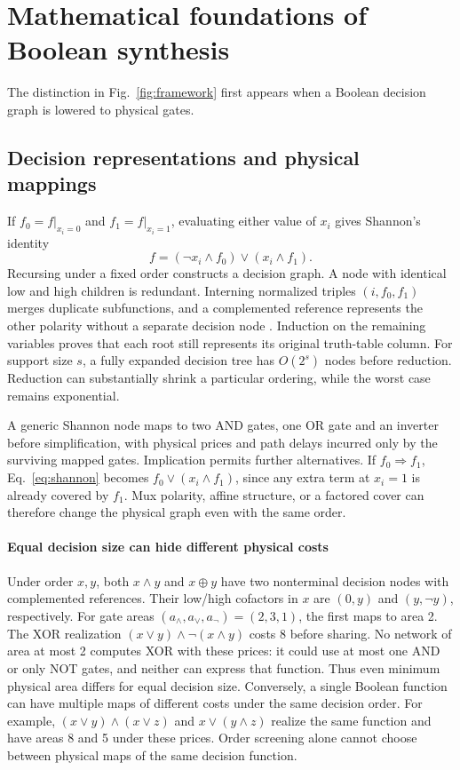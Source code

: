 \documentclass[journal,10pt]{IEEEtran}
\begin{document}
\section{Mathematical foundations of Boolean synthesis}
The distinction in Fig.~\ref{fig:framework} first appears when a Boolean decision graph is lowered to physical gates.
\subsection{Decision representations and physical mappings}
If \(f_0=f|_{x_i=0}\) and \(f_1=f|_{x_i=1}\), evaluating either value of \(x_i\) gives Shannon's identity \cite{shannon1949}
\begin{equation}
 f=(\neg x_i\land f_0)\lor(x_i\land f_1).
 \label{eq:shannon}
\end{equation}
Recursing under a fixed order constructs a decision graph. A node with identical low and high children is redundant. Interning normalized triples \((i,f_0,f_1)\) merges duplicate subfunctions, and a complemented reference represents the other polarity without a separate decision node \cite{bryant1986}. Induction on the remaining variables proves that each root still represents its original truth-table column. For support size \(s\), a fully expanded decision tree has \(O(2^s)\) nodes before reduction. Reduction can substantially shrink a particular ordering, while the worst case remains exponential.

A generic Shannon node maps to two AND gates, one OR gate and an inverter before simplification, with physical prices and path delays incurred only by the surviving mapped gates. Implication permits further alternatives. If \(f_0\Rightarrow f_1\), Eq.~\eqref{eq:shannon} becomes \(f_0\lor(x_i\land f_1)\), since any extra term at \(x_i=1\) is already covered by \(f_1\). Mux polarity, affine structure, or a factored cover can therefore change the physical graph even with the same order.

\paragraph{Equal decision size can hide different physical costs}
Under order \(x,y\), both \(x\land y\) and \(x\oplus y\) have two nonterminal decision nodes with complemented references. Their low/high cofactors in \(x\) are \((0,y)\) and \((y,\neg y)\), respectively. For gate areas \((a_\land,a_\lor,a_\neg)=(2,3,1)\), the first maps to area 2. The XOR realization \((x\lor y)\land\neg(x\land y)\) costs 8 before sharing. No network of area at most 2 computes XOR with these prices: it could use at most one AND or only NOT gates, and neither can express that function. Thus even minimum physical area differs for equal decision size. Conversely, a single Boolean function can have multiple maps of different costs under the same decision order. For example, \((x\lor y)\land(x\lor z)\) and \(x\lor(y\land z)\) realize the same function and have areas 8 and 5 under these prices. Order screening alone cannot choose between physical maps of the same decision function.
\end{document}
